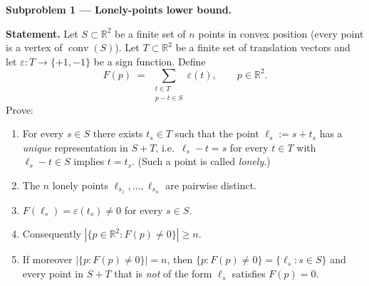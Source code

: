 \documentclass{article}
\begin{document}
\textbf{Subproblem 1 --- Lonely-points lower bound.}

\medskip
\textbf{Statement.}
Let $S\subset\mathbb{R}^2$ be a finite set of $n$ points in convex position (every point is a vertex of $\operatorname{conv}(S)$).
Let $T\subset\mathbb{R}^2$ be a finite set of translation vectors and let $\varepsilon:T\to\{+1,-1\}$ be a sign function.
Define
\[
  F(p) \;=\; \sum_{\substack{t\in T\\ p-t\in S}} \varepsilon(t),\qquad p\in\mathbb{R}^2.
\]
Prove:
\begin{enumerate}
  \item For every $s\in S$ there exists $t_s\in T$ such that the point $\ell_s := s+t_s$ has a \emph{unique} representation in $S+T$, i.e.\ $\ell_s - t = s$ for every $t\in T$ with $\ell_s - t \in S$ implies $t = t_s$.  (Such a point is called \emph{lonely}.)
  \item The $n$ lonely points $\ell_{s_1},\ldots,\ell_{s_n}$ are pairwise distinct.
  \item $F(\ell_s) = \varepsilon(t_s)\neq 0$ for every $s\in S$.
  \item Consequently $|\{p\in\mathbb{R}^2 : F(p)\neq 0\}| \ge n$.
  \item If moreover $|\{p : F(p)\neq 0\}| = n$, then $\{p : F(p)\neq 0\} = \{\ell_s : s\in S\}$ and every point in $S+T$ that is \emph{not} of the form $\ell_s$ satisfies $F(p)=0$.
\end{enumerate}
\end{document}
